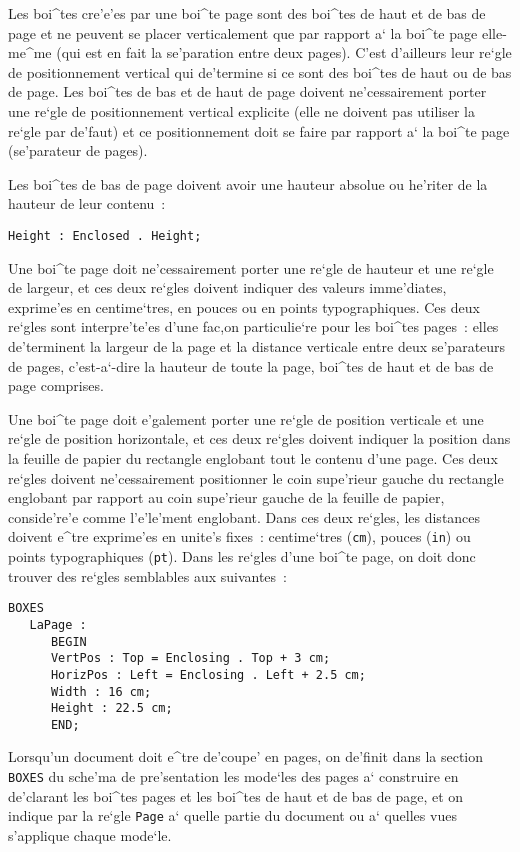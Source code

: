 {Les boi^tes cre'e'es par une boi^te page sont des boi^tes de haut et de bas
de page et ne peuvent se placer verticalement que par rapport a` la boi^te
page elle-me^me (qui est en fait la se'paration entre deux pages). C'est
d'ailleurs leur re`gle de positionnement vertical qui de'termine si ce sont des boi^tes
de haut ou de bas de page. Les boi^tes de bas et de haut de page doivent
ne'cessairement porter une re`gle de positionnement vertical explicite (elle
ne doivent pas utiliser la re`gle par de'faut) et ce positionnement doit se
faire par rapport a` la boi^te page (se'parateur de pages).

Les boi^tes de bas de page doivent avoir une hauteur absolue ou he'riter de
la hauteur de leur contenu~:
\begin{verbatim}
Height : Enclosed . Height;
\end{verbatim}

Une boi^te page doit ne'cessairement porter une re`gle de hauteur et une re`gle
de largeur, et ces deux re`gles doivent indiquer des valeurs imme'diates,
exprime'es en centime`tres, en pouces ou en points typographiques. Ces deux
re`gles sont interpre'te'es d'une fac,on particulie`re pour les boi^tes pages~:
elles de'terminent la largeur de la page et la distance verticale entre deux
se'parateurs de pages, c'est-a`-dire la hauteur de toute la page, boi^tes de
haut et de bas de page comprises.

Une boi^te page doit e'galement porter une re`gle de position verticale et une
re`gle de position horizontale, et ces deux re`gles doivent indiquer la
position dans la feuille de papier du rectangle englobant tout le contenu
d'une page. Ces deux re`gles doivent ne'cessairement positionner le coin
supe'rieur gauche du rectangle englobant par rapport au coin supe'rieur gauche
de la feuille de papier, conside're'e comme l'e'le'ment englobant. Dans ces deux
re`gles, les distances doivent e^tre exprime'es en unite's fixes~: centime`tres
({\tt cm}), pouces ({\tt in}) ou points typographiques ({\tt pt}). Dans les
re`gles d'une boi^te page, on doit donc trouver des re`gles semblables aux
suivantes~:

\begin{verbatim}
BOXES
   LaPage :
      BEGIN
      VertPos : Top = Enclosing . Top + 3 cm;
      HorizPos : Left = Enclosing . Left + 2.5 cm;
      Width : 16 cm;
      Height : 22.5 cm;
      END;
\end{verbatim}

Lorsqu'un document doit e^tre de'coupe' en pages, on de'finit dans la section
{\tt BOXES} du sche'ma de pre'sentation les mode`les des pages a` construire en
de'clarant les boi^tes pages et les boi^tes de haut et de bas de page, et
on indique par la re`gle {\tt Page} a` quelle partie du document ou a` quelles
vues s'applique chaque mode`le.

}
